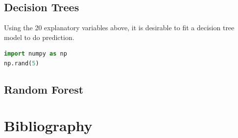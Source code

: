 \documentclass[11pt,a4paper]{article}
\begin{document}
\begin{figure}
        \qquad
        
        \label{fig:example}%
    \end{figure}
    
    \subsection{Decision Trees} \label{decision_trees}
    Using the 20 explanatory variables above, it is desirable to fit a decision tree model to do prediction.
\begin{lstlisting}[language = Python]
import numpy as np
np.rand(5)
\end{lstlisting}
    
    \subsection{Random Forest} \label{random_forest}
    
    
    
    \newpage
    \section{Bibliography}
\end{document}
